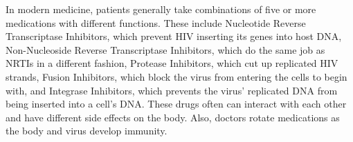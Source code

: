 In modern medicine, patients generally take combinations of five or more medications with different functions. These include Nucleotide Reverse Transcriptase Inhibitors, which prevent HIV inserting its genes into host DNA, Non-Nucleoside Reverse Transcriptase Inhibitors, which do the same job as NRTIs in a different fashion, Protease Inhibitors, which cut up replicated HIV strands, Fusion Inhibitors, which block the virus from entering the cells to begin with, and Integrase Inhibitors, which prevents the virus' replicated DNA from being inserted into a cell's DNA. These drugs often can interact with each other and have different side effects on the body. Also, doctors rotate medications as the body and virus develop immunity. 

%
%
